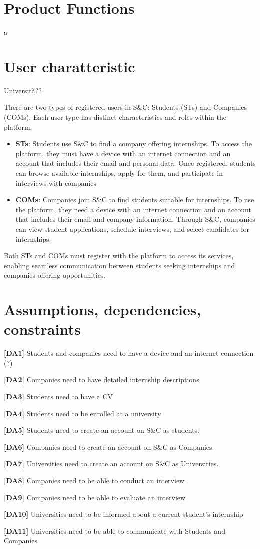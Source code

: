 \section{Product Functions}
a


\section{User charatteristic}

Università??

There are two types of registered users in S\&C: Students (STs) and Companies (COMs). Each user type has distinct characteristics and roles within the platform:

\begin{itemize}
    \item \textbf{STs}: Students use S\&C to find a company offering internships. To access the platform, they must have a device with an internet connection and an account that includes their email and personal data. Once registered, students can browse available internships, apply for them, and participate in interviews with 
    companies

    \item \textbf{COMs}:  Companies join S\&C to find students suitable for internships. To use the platform, they need a device with an internet connection and an account that includes their email and company information. Through S\&C, companies can view student applications, schedule interviews, and select candidates for internships.
\end{itemize}

Both STs and COMs must register with the platform to access its services, enabling seamless communication between students seeking internships and companies offering opportunities.

\section{Assumptions, dependencies, constraints}
\textbf{[DA1] }Students and companies need to have a device and an internet connection (?)

\textbf{[DA2]} Companies need to have detailed internship descriptions

\textbf{[DA3]} Students need to have a CV

\textbf{[DA4]} Students need to be enrolled at a university 

\textbf{[DA5]} Students need to create an account on S\&C as students.

\textbf{[DA6]} Companies need to create an account on S\&C as Companies.

\textbf{[DA7]} Universities need to create an account on S\&C as Universities.

\textbf{[DA8]} Companies need to be able to conduct an interview

\textbf{[DA9]} Companies need to be able to evaluate an interview

\textbf{[DA10]} Universities need to be informed about a current student's internship

\textbf{[DA11]} Universities need to be able to communicate with Students and Companies
